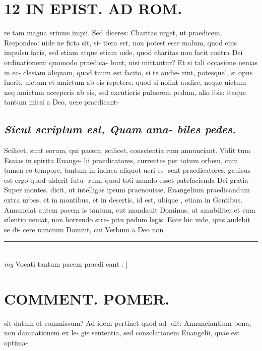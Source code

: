 \documentclass{article}
\begin{document}
\begin{pages}
\section*{12 IN EPIST. AD ROM.  }
\marginpar{[ p.]}\pstart re tam magna erimus impii. Sed diceres: Charitas urget, ut praedicem, Respondeo: uide ne ficta sit, si- tiera est, non potest esse malum, quod eius impulsu facis, sed etiam atque etiam uide, quod charitas non facit contra Dei ordinationem: quomodo praedica- bunt, nisi mittantur? Et si tali occasione uenias in ec- clesiam aliquam, quod tuum est facito, si te audie- rint, potesque ́, si opus fuerit, uictum et amictum ab eis repetere, quod si nolint audire, neque uictum neq amictum acceperis ab eis, sed excutieris puluerem pedum, alio ibis: itaque tantum missi a Deo, uere praedicant-  \pend
{}
{}
\subsection*{\textit{Sicut scriptum est, Quam ama- biles pedes. }}\pstart Scilicet, sunt eorum, qui pacem, scilicet, conscientia rum annunciant. Vidit tum Esaias in spiritu Euange- lii praedicatores, currentes per totum orbem, cum tamen eo tempore, tantum in iudaea aliquot ueri es- sent praedicatores, gauisus est ergo quod uiderit futu- rum, quod toti mundo esset patefacienda Dei gratia- Super montes, dicit, ut intelligas ipsum praenouisse, Euangelium praedicandum extra urbes, et in montibus, et in desertis, id est, ubique , etiam in Gentibus. Annunciat autem pacem is tantum, cut mandauit Dominus, ut amabiliter et cum silentio ueniat, non horrendo stre- pitu pedum legis. Ecce hic uide, quis audebit se di- cere nuncium Domint, cui Verbum a Deo non  \pend
\vspace{0.5cm}\noindent
\vspace{0.2cm}\rule{1cm}{0.2pt}\\ 
\hspace{0.2cm}\textit{mg}
\footnotesize Vocati tantum pacem praedi cant .  
\normalsize| 
\section*{COMMENT. POMER.  }\pstart sit datum et commissum? Ad idem pertinet quod ad- dit: Annunciantium bona, non damnationem ex le- gis sententia, sed consolationem Euangelii, quae est optima-  \pend
{}
{}

\end{pages}
\end{document}
